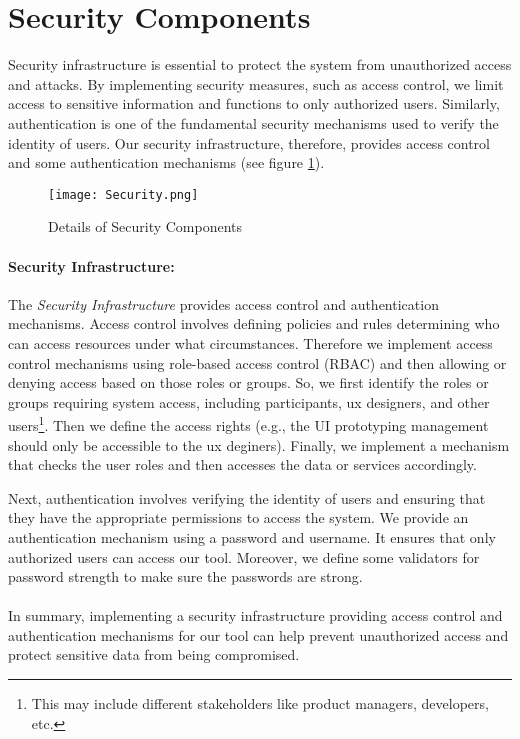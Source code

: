 \clearpage
\section{Security Components}
\label{sc:section:security}
Security infrastructure is essential to protect the system from unauthorized access and attacks. 
By implementing security measures, such as access control, we limit access to sensitive information and functions to only authorized users.
Similarly, authentication is one of the fundamental security mechanisms used to verify the identity of users.
Our security infrastructure, therefore, provides access control and some authentication mechanisms (see figure \ref{fig:sc:security}).

\begin{figure}[htbp!]
    \centering    
    \texttt{[image: Security.png]} 
    \caption[Details of Security Components]{Details of Security Components}
    \label{fig:sc:security}
\end{figure}

\paragraph{Security Infrastructure:}
The \textit{Security Infrastructure} provides access control and authentication mechanisms.
Access control involves defining policies and rules determining who can access resources under what circumstances.
Therefore we implement access control mechanisms using role-based access control (RBAC) and then allowing or denying access based on those roles or groups.
So, we first identify the roles or groups requiring system access, including participants, \ac{ux} designers, and other users\footnote{This may include different stakeholders like product managers, developers, etc.}. 
Then we define the access rights (e.g., the UI prototyping management should only be accessible to the \ac{ux} deginers).
Finally, we implement a mechanism that checks the user roles and then accesses the data or services accordingly. 

Next, authentication involves verifying the identity of users and ensuring that they have the appropriate permissions to access the system.
We provide an authentication mechanism using a password and username. 
It ensures that only authorized users can access our tool.
Moreover, we define some validators for password strength to make sure the passwords are strong.\\\\
In summary, implementing a security infrastructure providing access control and authentication mechanisms for our tool can help prevent unauthorized access and protect sensitive data from being compromised.

\clearpage